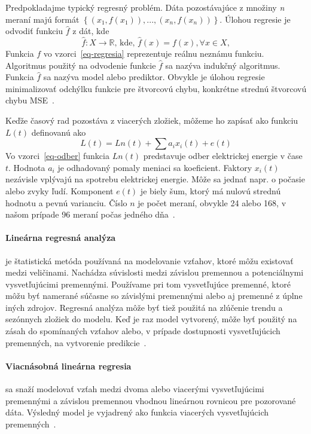 \documentclass[a4paper,slovak,12pt,appendix]{article}
\begin{document}
Predpokladajme typický regresný problém. Dáta pozostávajúce z množiny \textit{n}
meraní majú formát $\left\{(x_1, f(x_1)), ..., (x_n, f(x_n))\right\}$.
Úlohou regresie je odvodiť funkciu $\hat{f}$ z dát, kde
\begin{equation}
  \hat{f} : X \to \mathbb{R} \text{, kde, } \hat{f}(x) = f(x), \forall x \in X,
  \label{eq-regresia}
\end{equation}
Funkcia $f$ vo vzorci~\ref{eq-regresia} reprezentuje reálnu neznámu
funkciu. Algoritmus použitý na odvodenie funkcie $\hat{f}$ sa nazýva
indukčný algoritmus. Funkcia $\hat{f}$ sa nazýva model alebo
prediktor. Obvykle je úlohou regresie minimalizovať odchýlku funkcie pre
štvorcovú chybu, konkrétne strednú štvorcovú chybu MSE~\cite{Mendes-Moreira2012}.

Keďže časový rad pozostáva z viacerých zložiek, môžeme ho zapísať ako funkciu
$L(t)$ definovanú ako
\begin{equation}
  L(t) = Ln(t) + \sum a_i x_i(t) + e(t)
  \label{eq-odber}
\end{equation}
Vo vzorci~\ref{eq-odber} funkcia $Ln(t)$ predstavuje odber elektrickej energie
v čase $t$. Hodnota $a_i$ je odhadovaný pomaly meniaci sa koeficient. Faktory
$x_i(t)$ nezávisle vplývajú na spotrebu elektrickej energie. Môže sa jednať
napr. o počasie alebo zvyky ľudí. Komponent $e(t)$ je biely šum, ktorý má nulovú
strednú hodnotu a pevnú varianciu. Číslo $n$ je počet meraní, obvykle 24
alebo 168, v našom prípade 96 meraní počas jedného dňa~\cite{KumarSingh2013}.

\paragraph{Lineárna regresná analýza} je štatistická metóda používaná na
modelovanie vzťahov, ktoré môžu existovať medzi veličinami. Nachádza súvislosti
medzi závislou premennou a potenciálnymi vysvetľujúcimi premennými. Používame
pri tom vysvetľujúce premenné, ktoré môžu byť namerané súčasne so závislými
premennými alebo aj premenné z úplne iných zdrojov. Regresná analýza môže byť
tiež použitá na zlúčenie trendu a sezónnych zložiek do modelu. Keď je raz model
vytvorený, môže byť použitý na zásah do spomínaných vzťahov alebo, v prípade
dostupnosti vysvetľujúcich premenných, na vytvorenie predikcie~\cite{Liu1992}.

\paragraph{Viacnásobná lineárna regresia} sa snaží modelovať vzťah medzi dvoma
alebo viacerými vysvetľujúcimi premennými a závislou premennou vhodnou
lineárnou rovnicou pre pozorované dáta. Výsledný model je vyjadrený ako funkcia
viacerých vysvetľujúcich premenných~\cite{Grmanova2016}.
\end{document}
